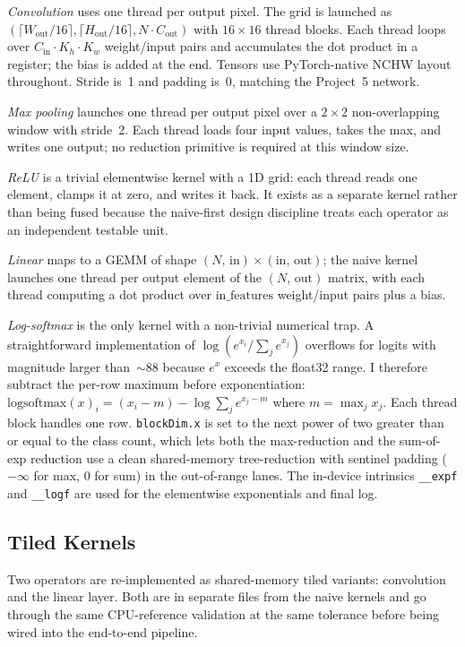 \documentclass[conference]{IEEEtran}
\begin{document}
\emph{Convolution} uses one thread per output pixel. The grid is
launched as $(\lceil W_{\text{out}}/16\rceil,\lceil H_{\text{out}}/16\rceil,
N\cdot C_{\text{out}})$ with $16\times16$ thread blocks. Each thread
loops over $C_{\text{in}}\cdot K_h\cdot K_w$ weight/input pairs and
accumulates the dot product in a register; the bias is added at the
end. Tensors use PyTorch-native NCHW layout throughout. Stride is~1
and padding is~0, matching the Project~5 network.

\emph{Max pooling} launches one thread per output pixel over a
$2\times2$ non-overlapping window with stride~2. Each thread loads
four input values, takes the max, and writes one output; no reduction
primitive is required at this window size.

\emph{ReLU} is a trivial elementwise kernel with a 1D grid: each
thread reads one element, clamps it at zero, and writes it back. It
exists as a separate kernel rather than being fused because the
naive-first design discipline treats each operator as an independent
testable unit.

\emph{Linear} maps to a GEMM of shape
$(N,\,\text{in})\times(\text{in},\,\text{out})$; the naive kernel
launches one thread per output element of the $(N,\,\text{out})$
matrix, with each thread computing a dot product over
$\text{in\_features}$ weight/input pairs plus a bias.

\emph{Log-softmax} is the only kernel with a non-trivial numerical
trap. A straightforward implementation of
$\log\!\left(e^{x_i}/\sum_j e^{x_j}\right)$ overflows for logits with
magnitude larger than~$\sim88$ because $e^{x}$ exceeds the
float32 range. I therefore subtract the per-row maximum before
exponentiation:
$\mathrm{logsoftmax}(x)_i = (x_i - m) - \log\sum_j e^{x_j - m}$ where
$m=\max_j x_j$. Each thread block handles one row. \texttt{blockDim.x}
is set to the next power of two greater than or equal to the class
count, which lets both the max-reduction and the sum-of-exp reduction
use a clean shared-memory tree-reduction with sentinel padding
($-\infty$ for max, $0$ for sum) in the out-of-range lanes. The
in-device intrinsics \texttt{\_\_expf} and \texttt{\_\_logf} are used
for the elementwise exponentials and final log.

\subsection{Tiled Kernels}
Two operators are re-implemented as shared-memory tiled variants:
convolution and the linear layer. Both are in separate files from the naive kernels and go through the
same CPU-reference validation at the same tolerance before being
wired into the end-to-end pipeline.
\end{document}

